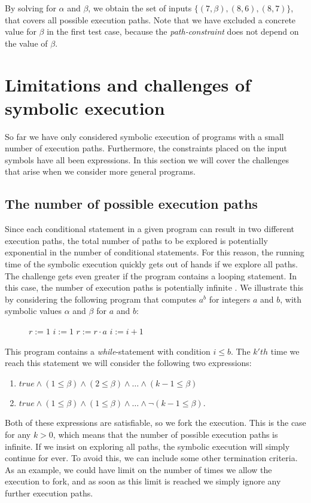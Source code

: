 	By solving for $\alpha$ and $\beta$, we obtain the set of inputs $\{(7, \beta), (8,6), (8, 7)\}$, that covers all possible execution paths. Note that we have excluded a concrete value for $\beta$ in the first test case, because the \emph{path-constraint} does not depend on the value of $\beta$. 
	 
	\fi 
\section{Limitations and challenges of symbolic execution}
	So far we have only considered symbolic execution of programs with a small number of execution paths. Furthermore, the constraints placed on the input symbols have all been expressions.
	In this section we will cover the challenges that arise when we consider more general programs.
	
	\subsection{The number of possible execution paths} 
		Since each conditional statement in a given program can result in two different execution paths, the total number of paths to be explored is potentially exponential in the number of conditional statements. 
		For this reason, the running time of the symbolic execution quickly gets out of hands if we explore all paths. 
		 The challenge gets even greater if the program contains a looping statement. In this case, the number of execution paths is potentially infinite \cite{CadarSen13}.
		  We illustrate this by considering the following program that computes $a^b$ for integers $a$ and $b$, with symbolic values $\alpha$ and $\beta$ for $a$ and $b$:
		\begin{figure}[!h]
			\begin{algorithmic}
				\State $r := 1$
				\State $i := 1$
					\State $ r := r\cdot a$
					\State $ i := i + 1$
				\EndWhile
				\State {}
				\EndProcedure
			\end{algorithmic}
		\end{figure}
		\pow{}
		
	This program contains a \textsl{while}-statement with condition $i \leq b$. The $k'th$ time we reach this statement we will consider the following two expressions:
	\begin{enumerate}
		\item $true \land (1 \leq \beta) \land (2 \leq \beta) \land \ldots \land (k-1 \leq \beta) $
		\item $true \land (1 \leq \beta) \land (1 \leq \beta) \land \ldots \land \neg (k-1 \leq \beta) $.
	\end{enumerate}
	Both of these expressions are satisfiable, so we fork the execution. This is the case for any $k > 0$, which means that the number of possible execution paths is infinite. If we insist on exploring all paths, the symbolic execution will simply continue for ever. To avoid this, we can include some other termination criteria. As an example, we could have limit on the number of times we allow the execution to fork, and as soon as this limit is reached we simply ignore any further execution paths.
	
